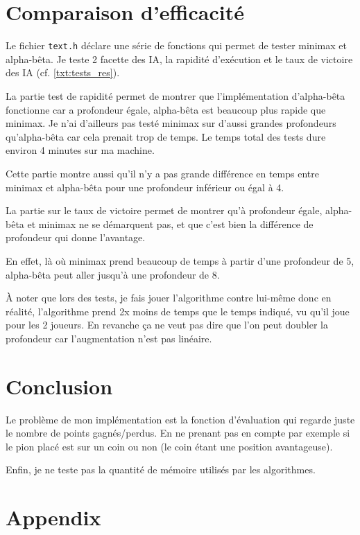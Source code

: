 \documentclass{article}
\begin{document}
\section{Comparaison d'efficacité}
Le fichier \texttt{text.h} déclare une série de fonctions qui permet de tester
minimax et alpha-bêta.
Je teste 2 facette des IA, la rapidité d'exécution et le taux de victoire des
IA (cf. \autoref{txt:tests_res}).
\label{sec:comp_eff}

La partie test de rapidité permet de montrer que l'implémentation d'alpha-bêta
fonctionne car a profondeur égale, alpha-bêta est beaucoup plus rapide que
minimax. Je n'ai d'ailleurs pas testé minimax sur d'aussi grandes profondeurs
qu'alpha-bêta car cela prenait trop de temps. Le temps total des tests dure
environ 4 minutes sur ma machine.

Cette partie montre aussi qu'il n'y a pas grande différence en temps entre
minimax et alpha-bêta pour une profondeur inférieur ou égal à 4.

La partie sur le taux de victoire permet de montrer qu'à profondeur égale,
alpha-bêta et minimax ne se démarquent pas, et que c'est bien la différence de
profondeur qui donne l'avantage.

En effet, là où minimax prend beaucoup de temps à partir d'une profondeur de 5,
alpha-bêta peut aller jusqu'à une profondeur de 8.

À noter que lors des tests, je fais jouer l'algorithme contre lui-même donc en
réalité, l'algorithme prend 2x moins de temps que le temps indiqué, vu qu'il joue
pour les 2 joueurs. En revanche ça ne veut pas dire que l'on peut doubler la
profondeur car l'augmentation n'est pas linéaire.

\section{Conclusion}
Le problème de mon implémentation est la fonction d'évaluation qui regarde juste
le nombre de points gagnés/perdus. En ne prenant pas en compte par exemple si le
pion placé est sur un coin ou non (le coin étant une position avantageuse).

Enfin, je ne teste pas la quantité de mémoire utilisés par les algorithmes.

\newpage
\appendix
\section*{Appendix}
\listoffigures
\end{document}
